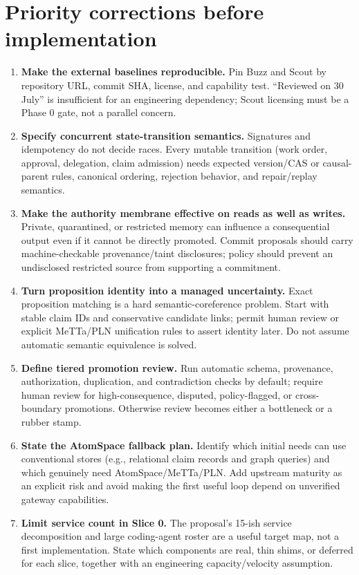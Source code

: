 \documentclass[10pt]{article}
\newcommand{\key}[1]{\textbf{#1}}
\begin{document}
\section*{Priority corrections before implementation}
\begin{enumerate}[leftmargin=1.45em,itemsep=4pt]
  \item \key{Make the external baselines reproducible.} Pin Buzz and Scout by repository URL, commit SHA, license, and capability test. ``Reviewed on 30 July'' is insufficient for an engineering dependency; Scout licensing must be a Phase 0 gate, not a parallel concern.
  \item \key{Specify concurrent state-transition semantics.} Signatures and idempotency do not decide races. Every mutable transition (work order, approval, delegation, claim admission) needs expected version/CAS or causal-parent rules, canonical ordering, rejection behavior, and repair/replay semantics.
  \item \key{Make the authority membrane effective on reads as well as writes.} Private, quarantined, or restricted memory can influence a consequential output even if it cannot be directly promoted. Commit proposals should carry machine-checkable provenance/taint disclosures; policy should prevent an undisclosed restricted source from supporting a commitment.
  \item \key{Turn proposition identity into a managed uncertainty.} Exact proposition matching is a hard semantic-coreference problem. Start with stable claim IDs and conservative candidate links; permit human review or explicit MeTTa/PLN unification rules to assert identity later. Do not assume automatic semantic equivalence is solved.
  \item \key{Define tiered promotion review.} Run automatic schema, provenance, authorization, duplication, and contradiction checks by default; require human review for high-consequence, disputed, policy-flagged, or cross-boundary promotions. Otherwise review becomes either a bottleneck or a rubber stamp.
  \item \key{State the AtomSpace fallback plan.} Identify which initial needs can use conventional stores (e.g., relational claim records and graph queries) and which genuinely need AtomSpace/MeTTa/PLN. Add upstream maturity as an explicit risk and avoid making the first useful loop depend on unverified gateway capabilities.
  \item \key{Limit service count in Slice 0.} The proposal's 15-ish service decomposition and large coding-agent roster are a useful target map, not a first implementation. State which components are real, thin shims, or deferred for each slice, together with an engineering capacity/velocity assumption.
\end{enumerate}
\end{document}
